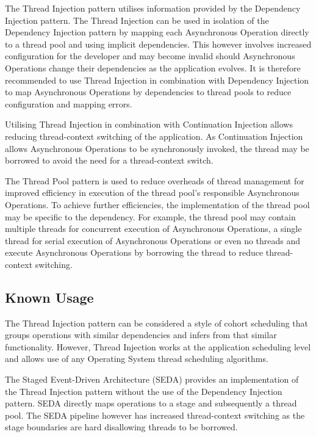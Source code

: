 \documentclass[prodmode]{style/acmlarge}
\begin{document}
The Thread Injection pattern utilises information provided by the Dependency
Injection pattern.  The Thread Injection can be used in isolation of the
Dependency Injection pattern by mapping each Asynchronous Operation directly to
a thread pool and using implicit dependencies.  This however involves increased
configuration for the developer and may become invalid should Asynchronous
Operations change their dependencies as the application evolves.  It is
therefore recommended to use Thread Injection in combination with Dependency
Injection to map Asynchronous Operations by dependencies to thread pools to
reduce configuration and mapping errors.

Utilising Thread Injection in combination with Continuation Injection allows
reducing thread-context switching of the application.  As Continuation Injection
allows Asynchronous Operations to be synchronously invoked, the thread may be
borrowed to avoid the need for a thread-context switch.

The Thread Pool pattern \cite{thread-per-request} is used to reduce overheads of
thread management for improved efficiency in execution of the thread pool's
responsible Asynchronous Operations.  To achieve further efficiencies, the
implementation of the thread pool may be specific to the dependency.  For
example, the thread pool may contain multiple threads for concurrent execution
of Asynchronous Operations, a single thread for serial execution of Asynchronous
Operations or even no threads and execute Asynchronous Operations by borrowing
the thread to reduce thread-context switching.


\subsection{Known Usage}

The Thread Injection pattern can be considered a style of cohort scheduling
\cite{cohort} that groups operations with similar dependencies and infers from
that similar functionality.  However, Thread Injection works at the application
scheduling level and allows use of any Operating System thread scheduling
algorithms.

The Staged Event-Driven Architecture (SEDA) \cite{seda} provides an
implementation of the Thread Injection pattern without the use of the Dependency
Injection pattern.  SEDA directly maps operations to a stage and subsequently a
thread pool.  The SEDA pipeline however has increased thread-context switching
as the stage boundaries are hard disallowing threads to be borrowed.
\end{document}
